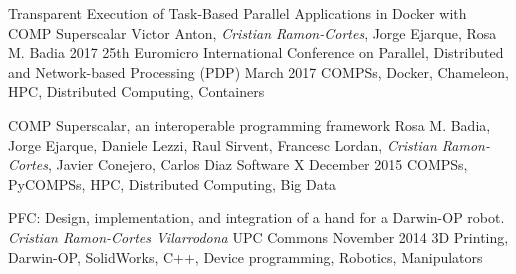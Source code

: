 \begin{publications}   
    \publication
        {Transparent Execution of Task-Based Parallel Applications in Docker with COMP Superscalar}
        {Victor Anton, \textit{Cristian Ramon-Cortes}, Jorge Ejarque, Rosa M. Badia}
        {2017 25th Euromicro International Conference on Parallel, Distributed and Network-based Processing (PDP)}
        {March 2017}
        {COMPSs, Docker, Chameleon, HPC, Distributed Computing, Containers}
        {}

    \publication
        {COMP Superscalar, an interoperable programming framework}
        {Rosa M. Badia, Jorge Ejarque, Daniele Lezzi, Raul Sirvent, Francesc Lordan, \textit{Cristian Ramon-Cortes}, Javier Conejero, Carlos Diaz}
        {Software X}
        {December 2015}
        {COMPSs, PyCOMPSs, HPC, Distributed Computing, Big Data}
        {}
        
    \publication
        {PFC: Design, implementation, and integration of a hand for a Darwin-OP robot.}
        {\textit{Cristian Ramon-Cortes Vilarrodona}}
        {UPC Commons}
        {November 2014}
        {3D Printing, Darwin-OP, SolidWorks, C++, Device programming, Robotics, Manipulators}
        {}
    
\end{publications}
